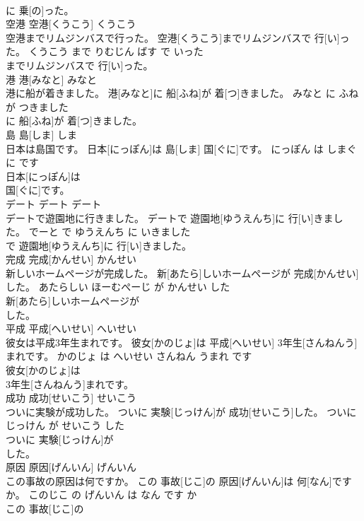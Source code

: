 \documentclass[8pt]{extreport}
\begin{document}
\begin{CJK}{UTF8}{min}
\\	に 乗[の]った。			
\\	空港	空港[くうこう]	くうこう	
\\	空港までリムジンバスで行った。	空港[くうこう]までリムジンバスで 行[い]った。	くうこう まで りむじん ばす で いった	
\\	までリムジンバスで 行[い]った。			
\\	港	港[みなと]	みなと	
\\	港に船が着きました。	港[みなと]に 船[ふね]が 着[つ]きました。	みなと に ふね が つきました	
\\	に 船[ふね]が 着[つ]きました。			
\\	島	島[しま]	しま	
\\	日本は島国です。	日本[にっぽん]は 島[しま] 国[ぐに]です。	にっぽん は しまぐに です	
\\	日本[にっぽん]は
\\	国[ぐに]です。			
\\	デート	デート	デート	
\\	デートで遊園地に行きました。	デートで 遊園地[ゆうえんち]に 行[い]きました。	でーと で ゆうえんち に いきました	
\\	で 遊園地[ゆうえんち]に 行[い]きました。			
\\	完成	完成[かんせい]	かんせい	
\\	新しいホームページが完成した。	新[あたら]しいホームページが 完成[かんせい]した。	あたらしい ほーむぺーじ が かんせい した	
\\	新[あたら]しいホームページが
\\	した。			
\\	平成	平成[へいせい]	へいせい	
\\	彼女は平成3年生まれです。	彼女[かのじょ]は 平成[へいせい] 3年生[さんねんう]まれです。	かのじょ は へいせい さんねん うまれ です	
\\	彼女[かのじょ]は
\\	3年生[さんねんう]まれです。			
\\	成功	成功[せいこう]	せいこう	
\\	ついに実験が成功した。	ついに 実験[じっけん]が 成功[せいこう]した。	ついに じっけん が せいこう した	
\\	ついに 実験[じっけん]が
\\	した。			
\\	原因	原因[げんいん]	げんいん	
\\	この事故の原因は何ですか。	この 事故[じこ]の 原因[げんいん]は 何[なん]ですか。	このじこ の げんいん は なん です か	
\\	この 事故[じこ]の

\end{CJK}
\end{document}
